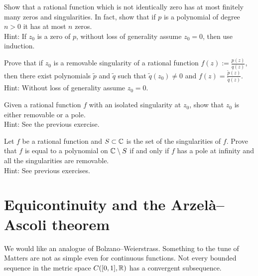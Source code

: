 \begin{exercise}
Show that a rational function which is not identically
zero has at most finitely many zeros and
singularities.  In fact, show that if $p$ is a polynomial of 
degree $n > 0$ it has at most $n$ zeros.
\\
Hint: If $z_0$ is a zero of $p$, without loss of generality assume $z_0 =
0$, then use induction.
\end{exercise}

\begin{exercise}
Prove that if $z_0$ is a removable singularity of a rational
function $f(z) := \frac{p(z)}{q(z)}$, then there exist
polynomials $\widetilde{p}$ and $\widetilde{q}$ such that
$\widetilde{q}(z_0) \not= 0$ and $f(z) =
\frac{\widetilde{p}(z)}{\widetilde{q}(z)}$.
\\
Hint: Without loss of generality assume $z_0 = 0$.
\end{exercise}

\begin{exercise}
Given a rational function $f$ with an isolated singularity at $z_0$,
show that $z_0$ is either removable or a pole.
\\
Hint: See the previous exercise.
\end{exercise}

\begin{exercise}
Let $f$ be a rational function and $S \subset {\mathbb{C}}$ is the 
set of the singularities of $f$.
Prove that $f$ is equal to a polynomial on ${\mathbb{C}} \setminus S$
if and only if
$f$ has a pole at infinity and all the singularities are removable.
\\
Hint: See previous exercises.
\end{exercise}




\sectionnewpage
\section{Equicontinuity and the Arzel\`a--Ascoli theorem}
\label{sec:arzelaascoli}


We would like an analogue of Bolzano--Weierstrass.  Something to the tune of
Matters are not
as simple even for continuous functions. 
Not every bounded sequence in the metric space $C([0,1],{\mathbb{R}})$ has
a convergent subsequence.

